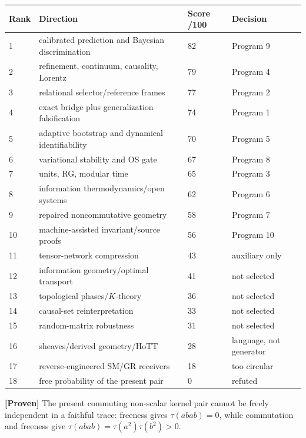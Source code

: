 \documentclass[11pt,a4paper,openany]{report}
\newcommand{\statusProven}{\textcolor{fingreen}{[Proven]}}
\begin{document}
\begin{center}
\begingroup\small
\setlength{\tabcolsep}{3.5pt}
\renewcommand{\arraystretch}{1.16}
\begin{longtable}{@{}p{}p{}p{}p{}@{}}
\toprule
\textbf{Rank} & \textbf{Direction} & \textbf{Score /\allowbreak{}100} & \textbf{Decision} \\
\midrule
\endhead
1 & calibrated prediction and Bayesian discrimination & 82 & Program 9 \\
2 & refinement, continuum, causality, Lorentz & 79 & Program 4 \\
3 & relational selector/\allowbreak{}reference frames & 77 & Program 2 \\
4 & exact bridge plus generalization falsification & 74 & Program 1 \\
5 & adaptive bootstrap and dynamical identifiability & 70 & Program 5 \\
6 & variational stability and OS gate & 67 & Program 8 \\
7 & units, RG, modular time & 65 & Program 3 \\
8 & information thermodynamics/\allowbreak{}open systems & 62 & Program 6 \\
9 & repaired noncommutative geometry & 58 & Program 7 \\
10 & machine-assisted invariant/\allowbreak{}source proofs & 56 & Program 10 \\
11 & tensor-network compression & 43 & auxiliary only \\
12 & information geometry/\allowbreak{}optimal transport & 41 & not selected \\
13 & topological phases/\allowbreak{}\(K\)-theory & 36 & not selected \\
14 & causal-set reinterpretation & 33 & not selected \\
15 & random-matrix robustness & 31 & not selected \\
16 & sheaves/\allowbreak{}derived geometry/\allowbreak{}HoTT & 28 & language, not generator \\
17 & reverse-engineered SM/\allowbreak{}GR receivers & 18 & too circular \\
18 & free probability of the present pair & 0 & refuted \\
\bottomrule
\end{longtable}
\endgroup
\end{center}

\textbf{\statusProven{}} The present commuting non-scalar kernel pair cannot be freely independent in a faithful trace: freeness gives \(\tau(abab)=0\), while commutation and freeness give \(\tau(abab)=\tau(a^2)\tau(b^2)>0\).
\end{document}
